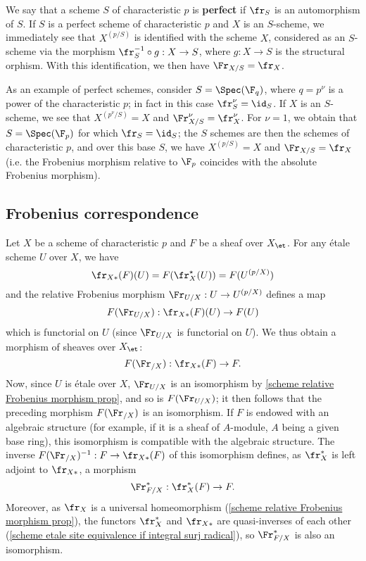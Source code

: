 We say that a scheme $S$ of characteristic $p$ is \textbf{perfect} if $\fr_S$ is an automorphism of $S$. If $S$ is a perfect scheme of characteristic $p$ and $X$ is an $S$-scheme, we immediately see that $X^{(p/S)}$ is identified with the scheme $X$, considered as an $S$-scheme via the morphism $\fr_S^{-1}\circ g:X\to S$, where $g:X\to S$ is the structural orphism. With this identification, we then have $\Fr_{X/S}=\fr_X$.\par

As an example of perfect schemes, consider $S=\Spec(\F_q)$, where $q=p^\nu$ is a power of the characteristic $p$; in fact in this case $\fr_S^\nu=\id_S$. If $X$ is an $S$-scheme, we see that $X^{(p^\nu/S)}=X$ and $\Fr_{X/S}^\nu=\fr_X^\nu$. For $\nu=1$, we obtain that $S=\Spec(\F_p)$ for which $\fr_S=\id_S$; the $S$ schemes are then the schemes of characteristic $p$, and over this base $S$, we have $X^{(p/S)}=X$ and $\Fr_{X/S}=\fr_X$ (i.e. the Frobenius morphism relative to $\F_p$ coincides with the absolute Frobenius morphism).

\subsection{Frobenius correspondence}
Let $X$ be a scheme of characteristic $p$ and $F$ be a sheaf over $X_{\et}$. For any \'etale scheme $U$ over $X$, we have
\[\fr_{X*}(F)(U)=F(\fr_X^\star(U))=F(U^{(p/X)})\]
and the relative Frobenius morphism $\Fr_{U/X}:U\to U^{(p/X)}$ defines a map
\[F(\Fr_{U/X}):\fr_{X*}(F)(U)\to F(U)\]
which is functorial on $U$ (since $\Fr_{U/X}$ is functorial on $U$). We thus obtain a morphism of sheaves over $X_\et$:
\[F(\Fr_{/X}):\fr_{X*}(F)\to F.\]
Now, since $U$ is \'etale over $X$, $\Fr_{U/X}$ is an isomorphism by \cref{scheme relative Frobenius morphism prop}, and so is $F(\Fr_{U/X})$; it then follows that the preceding morphism $F(\Fr_{/X})$ is an isomorphism. If $F$ is endowed with an algebraic structure (for example, if it is a sheaf of $A$-module, $A$ being a given base ring), this isomorphism is compatible with the algebraic structure. The inverse $F(\Fr_{/X})^{-1}:F\to\fr_{X*}(F)$ of this isomorphism defines, as $\fr_X^*$ is left adjoint to $\fr_{X*}$, a morphism
\[\Fr_{F/X}^*:\fr_X^*(F)\to F.\]
Moreover, as $\fr_X$ is a universal homeomorphism (\cref{scheme relative Frobenius morphism prop}), the functors $\fr_X^*$ and $\fr_{X*}$ are quasi-inverses of each other (\cref{scheme etale site equivalence if integral surj radical}), so $\Fr_{F/X}^*$ is also an isomorphism.

